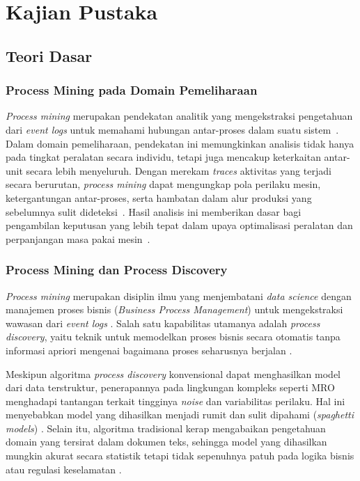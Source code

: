 \chapter{Kajian Pustaka}

\section{Teori Dasar}
\subsection{Process Mining pada Domain Pemeliharaan}
\textit{Process mining} merupakan pendekatan analitik yang mengekstraksi pengetahuan dari \textit{event logs} untuk memahami hubungan antar-proses dalam suatu sistem~\cite{horn2019application}. Dalam domain pemeliharaan, pendekatan ini memungkinkan analisis tidak hanya pada tingkat peralatan secara individu, tetapi juga mencakup keterkaitan antar-unit secara lebih menyeluruh. Dengan merekam \textit{traces} aktivitas yang terjadi secara berurutan, \textit{process mining} dapat mengungkap pola perilaku mesin, ketergantungan antar-proses, serta hambatan dalam alur produksi yang sebelumnya sulit dideteksi~\cite{horn2019application}. Hasil analisis ini memberikan dasar bagi pengambilan keputusan yang lebih tepat dalam upaya optimalisasi peralatan dan perpanjangan masa pakai mesin~\cite{horn2019application}.

\subsection{Process Mining dan Process Discovery}
\textit{Process mining} merupakan disiplin ilmu yang menjembatani \textit{data science} dengan manajemen proses bisnis (\textit{Business Process Management}) untuk mengekstraksi wawasan dari \textit{event logs} \cite{vanderAalst2016_process_mining}. Salah satu kapabilitas utamanya adalah \textit{process discovery}, yaitu teknik untuk memodelkan proses bisnis secara otomatis tanpa informasi apriori mengenai bagaimana proses seharusnya berjalan \cite{augusto2019automated}.

Meskipun algoritma \textit{process discovery} konvensional dapat menghasilkan model dari data terstruktur, penerapannya pada lingkungan kompleks seperti MRO menghadapi tantangan terkait tingginya \textit{noise} dan variabilitas perilaku. Hal ini menyebabkan model yang dihasilkan menjadi rumit dan sulit dipahami (\textit{spaghetti models}) \cite{augusto2019automated}. Selain itu, algoritma tradisional kerap mengabaikan pengetahuan domain yang tersirat dalam dokumen teks, sehingga model yang dihasilkan mungkin akurat secara statistik tetapi tidak sepenuhnya patuh pada logika bisnis atau regulasi keselamatan \cite{norouzifar2024}.

